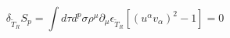 \begin{equation}\label{27}
\delta_{\tilde T_R}S_p=\int d\tau 
d^p\sigma\rho^\mu\partial_\mu\epsilon_{\tilde T_R}[(u^\alpha 
v_\alpha)^2-1]=0
\end{equation}

